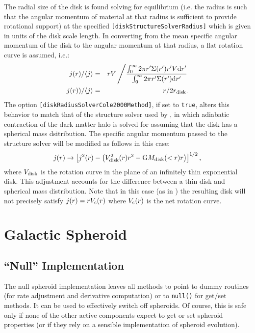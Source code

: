 The radial size of the disk is found solving for equilibrium (i.e. the radius is such that the angular momentum of material at that radius is sufficient to provide rotational support) at the specified {\tt [diskStructureSolverRadius]} which is given in units of the disk scale length. In converting from the mean specific angular momentum of the disk to the angular momentum at that radius, a flat rotation curve is assumed, i.e.:
\begin{eqnarray}
 j(r)/\langle j \rangle &=& r V \left/ {\int_0^\infty 2 \pi r^\prime \Sigma(r^\prime) r^\prime V {\rm d} r^\prime \over \int_0^\infty 2 \pi r^\prime \Sigma(r^\prime) {\rm d} r^\prime} \right. \nonumber \\
 j(r))/\langle j \rangle &=& r / 2 r_{\rm disk}.
\end{eqnarray}
The option {\tt [diskRadiusSolverCole2000Method]}, if set to {\tt true}, alters this behavior to match that of the structure solver used by \cite{cole_hierarchical_2000}, in which adiabatic contraction of the dark matter halo is solved for assuming that the disk has a spherical mass dsitribution. The specific angular momentum passed to the structure solver will be modified as follows in this case:
\begin{equation}
 j(r) \rightarrow \left[ j^2(r) - \left( V_{\rm disk}^2(r) r^2 - {\rm G} M_{\rm disk}(<r) r \right) \right]^{1/2},
\end{equation}
where $V_{\rm disk}$ is the rotation curve in the plane of an infinitely thin exponential disk. This adjustment accounts for the difference between a thin disk and spherical mass distribution. Note that in this case (as in \citealt{cole_hierarchical_2000}) the resulting disk will not precisely satisfy $j(r) = r V_{\rm c}(r)$ where $V_{\rm c}(r)$ is the net rotation curve.

\section{Galactic Spheroid}

\subsection{``Null'' Implementation}

The null spheroid implementation leaves all methods to point to dummy routines (for rate adjustment and derivative computation) or to {\tt null()} for get/set methods. It can be used to effectively switch off spheroids. Of course, this is safe only if none of the other active components expect to get or set spheroid properties (or if they rely on a sensible implementation of spheroid evolution).

